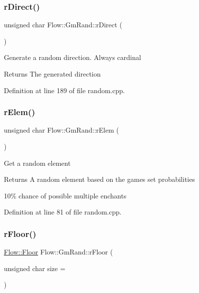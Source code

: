\subsubsection{\texorpdfstring{r\+Direct()}{rDirect()}}
{\footnotesize\ttfamily unsigned char Flow\+::\+Gm\+Rand\+::r\+Direct (\begin{DoxyParamCaption}{ }\end{DoxyParamCaption})}

Generate a random direction. Always cardinal \begin{DoxyReturn}{Returns}
The generated direction 
\end{DoxyReturn}


Definition at line 189 of file random.\+cpp.

\hypertarget{class_flow_1_1_gm_rand_a7df923fe60c18e20a157de7aa599f533}{}\label{class_flow_1_1_gm_rand_a7df923fe60c18e20a157de7aa599f533} 
\subsubsection{\texorpdfstring{r\+Elem()}{rElem()}}
{\footnotesize\ttfamily unsigned char Flow\+::\+Gm\+Rand\+::r\+Elem (\begin{DoxyParamCaption}{ }\end{DoxyParamCaption})}

Get a random element \begin{DoxyReturn}{Returns}
A random element based on the game\textquotesingle{}s set probabilities 
\end{DoxyReturn}
10\% chance of possible multiple enchants 

Definition at line 81 of file random.\+cpp.

\hypertarget{class_flow_1_1_gm_rand_a9ca568e62a941c10e42bedb3e334ed52}{}\label{class_flow_1_1_gm_rand_a9ca568e62a941c10e42bedb3e334ed52} 
\subsubsection{\texorpdfstring{r\+Floor()}{rFloor()}}
{\footnotesize\ttfamily \hyperlink{class_flow_1_1_floor}{Flow\+::\+Floor} Flow\+::\+Gm\+Rand\+::r\+Floor (\begin{DoxyParamCaption}\item[{unsigned char}]{size = {} }\end{DoxyParamCaption})}

